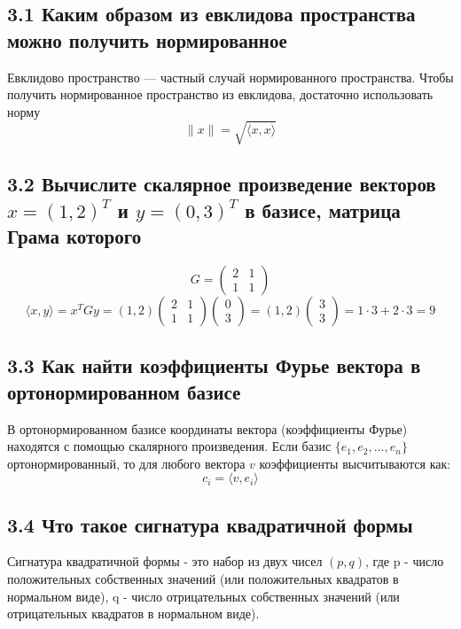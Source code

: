 \documentclass{article}
\begin{document}
\subsection*{3.1 Каким образом из евклидова пространства можно получить нормированное}
Евклидово пространство — частный случай нормированного пространства. Чтобы получить нормированное пространство из евклидова, достаточно использовать норму
\[\|x\| = \sqrt{\langle x, x\rangle}\]

\subsection*{3.2 Вычислите скалярное произведение векторов \(x = (1, 2)^T\) и \(y = (0, 3)^T\) в базисе, матрица Грама которого}
\[G = \left(\begin{array}{cc}
2 & 1 \\
1 & 1
\end{array}\right)\]
\[\langle x, y \rangle = x^T G y = (1, 2) \begin{pmatrix}2 & 1\\1 & 1\end{pmatrix} \begin{pmatrix}0\\3\end{pmatrix} = (1, 2) \begin{pmatrix}3\\3\end{pmatrix} = 1\cdot3 + 2\cdot3 = 9\]

\subsection*{3.3 Как найти коэффициенты Фурье вектора в ортонормированном базисе}
В ортонормированном базисе координаты вектора (коэффициенты Фурье) находятся с помощью скалярного произведения. Если базис \(\{e_1, e_2, ..., e_n\}\) ортонормированный, то для любого вектора \(v\) коэффициенты высчитываются как:
\[c_i = \langle v, e_i \rangle\]

\subsection*{3.4 Что такое сигнатура квадратичной формы}
Сигнатура квадратичной формы - это набор из двух чисел \((p, q)\), где p - число положительных собственных значений (или положительных квадратов в нормальном виде), q - число отрицательных собственных значений (или отрицательных квадратов в нормальном виде).
\end{document}
